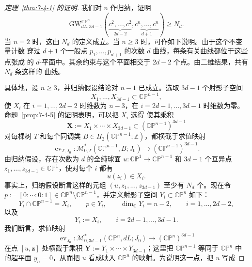 \begin{proof}[定理~\ref{thm:7-4-1} 的证明]
我们对 $n$ 作归纳，证明
\begin{equation}\label{eq:7-4-8}
  \mathrm{GW}^{\mathbb{CP}^n}_{dL,3d-1}
  (\underbrace{c^2,\ldots,c^2}_{2d-2},
   \underbrace{c^n,\ldots,c^n}_{d+1})
  \ge N_d.
\end{equation}
当 $n=2$ 时，这由 $N_d$ 的定义成立。当 $n\ge3$ 时，可作如下说明。由于这个不变量计数
穿过 $d+1$ 个一般点 $p_1,\ldots,p_{d+1}$ 的次数 $d$ 曲线，每条有关曲线都位于这些点张成
的 $d$-平面中。其余约束与这个平面相交于 $2d-2$ 个点。由二维结果，共有 $N_d$ 条这样的
曲线。

具体地，设 $n\ge3$，并归纳假设结论对 $n-1$ 已成立。选取 $3d-1$ 个射影子空间
\[
  X_1,\ldots,X_{3d-1}\subset\mathbb{CP}^{n-1},
\]
使 $X_i$ 在 $i=1,\ldots,2d-2$ 时维数为 $n-3$，在
$i=2d-1,\ldots,3d-1$ 时维数为零。命题~\ref{prop:7-4-5} 的证明表明，可以把 $X_i$ 选得
使其乘积
\[
  \mathbf X:=X_1\times\cdots\times X_{3d-1}
  \subset(\mathbb{CP}^{n-1})^{3d-1}
\]
对每棵树 $T$ 和每个同调类 $B\in H_2(\mathbb{CP}^{n-1};\mathbb Z)$，都横截于求值映射
\[
  \operatorname{ev}_{T,J_0}:
  \mathcal M^*_{0,T}(\mathbb{CP}^{n-1},B;J_0)
  \longrightarrow(\mathbb{CP}^{n-1})^{3d-1}.
\]
由归纳假设，存在次数为 $d$ 的全纯球面
$u:\mathbb{CP}^1\to\mathbb{CP}^{n-1}$ 和 $3d-1$ 个互异点
$z_1,\ldots,z_{3d-1}\in\mathbb{CP}^1$，使对每个 $i$ 都有
\[
  u(z_i)\in X_i.
\]
事实上，归纳假设断言这样的元组 $(u,z_1,\ldots,z_{3d-1})$ 至少有 $N_d$ 个。现在令
$p:=[0:\cdots:0:1]\in\mathbb{CP}^n\setminus\mathbb{CP}^{n-1}$，并定义射影子空间
$Y_i\subset\mathbb{CP}^n$ 如下：
\[
  Y_i\cap\mathbb{CP}^{n-1}=X_i,
  \qquad p\in Y_i,
  \qquad \dim_{\mathbb C}Y_i=n-2,
  \qquad i=1,\ldots,2d-2,
\]
以及
\[
  Y_i:=X_i,
  \qquad i=2d-1,\ldots,3d-1.
\]
我们断言，求值映射
\[
  \operatorname{ev}_{J_0}:
  \mathcal M^*_{0,3d-1}(\mathbb{CP}^n,dL;J_0)
  \longrightarrow(\mathbb{CP}^n)^{3d-1}
\]
在点 $[u,\mathbf z]$ 处横截于乘积
$\mathbf Y:=Y_1\times\cdots\times Y_{3d-1}$；这里把
$\mathbb{CP}^{n-1}$ 等同于 $\mathbb{CP}^n$ 中的超平面 $y_n=0$，从而把 $u$ 看成映入
$\mathbb{CP}^n$ 的映射。为说明这一点，把 $u$ 写成

\end{proof}
